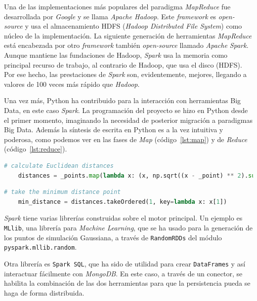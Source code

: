 \documentclass[11pt,spanish,listoffigures,listoftables]{tfgetsinf}
\begin{document}
        Una de las implementaciones más populares del paradigma {\em MapReduce} fue desarrollada por {\em Google} y se llama {\em Apache Hadoop}. Este {\em framework} es {\em open-source} y usa el almacenamiento HDFS ({\em Hadoop Distributed File System}) como núcleo de la implementación. La siguiente generación de herramientas {\em MapReduce} está encabezada por otro {\em framework} también {\em open-source} llamado {\em Apache Spark}. Aunque mantiene las fundaciones de Hadoop, {\em Spark} usa la memoria como principal recurso de trabajo, al contrario de Hadoop, que usa el disco (HDFS). Por ese hecho, las prestaciones de {\em Spark} son, evidentemente, mejores, llegando a valores de 100 veces más rápido que {\em Hadoop}.
        
        Una vez más, Python ha contribuido para la interacción con herramientas Big Data, en este caso {\em Spark}. La programación del proyecto se hizo en Python desde el primer momento, imaginando la necesidad de posterior migración a paradigmas Big Data. Además la síntesis de escrita en Python es a la vez intuitiva y poderosa, como podemos ver en las fases de {\em Map} (código~\ref{lst:map}) y de {\em Reduce} (código~\ref{lst:reduce}).
        
        \begin{lstlisting}[language=Python, caption=Map en Python., label={lst:map}]
    # calculate Euclidean distances
    distances = _points.map(lambda x: (x, np.sqrt((x - _point) ** 2).sum()))
	\end{lstlisting}
	        
        \begin{lstlisting}[language=Python, caption=Reduce en Python., label={lst:reduce}]
    # take the minimum distance point
    min_distance = distances.takeOrdered(1, key=lambda x: x[1])
	\end{lstlisting}
	
	{\em Spark} tiene varias librerías construidas sobre el motor principal. Un ejemplo es {\tt MLlib}, una librería para {\em Machine Learning}, que se ha usado para la generación de los puntos de simulación Gaussiana, a través de {\tt RandomRDDs} del módulo {\tt pyspark.mllib.random}. 
	
	Otra librería es {\tt Spark SQL}, que ha sido de utilidad para crear {\tt DataFrames} y así interactuar fácilmente con {\em MongoDB}. En este caso, a través de un conector, se habilita la combinación de las dos herramientas para que la persistencia pueda se haga de forma distribuida.
        
\end{document}
